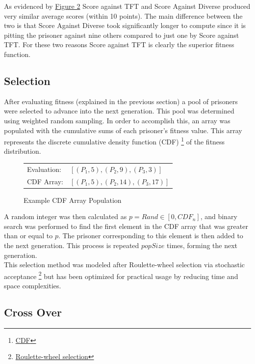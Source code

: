 \documentclass[12pt]{article}
\begin{document}
As evidenced by \hyperref[fig2]{Figure 2} Score against TFT and Score Against Diverse
produced very similar average scores (within 10 points).  The main difference
between the two is that Score Against Diverse took significantly longer to compute
since it is pitting the prisoner against nine others compared to just one by Score against TFT.
For these two reasons Score against TFT is clearly the superior fitness function.

\subsection{Selection}

After evaluating fitness (explained in the previous section) a pool of
prisoners were selected to advance into the next generation.  This pool was
determined using weighted random sampling. In order to accomplish this, an array
was populated with the cumulative sums of each prisoner's fitness value.  This
array represents the discrete cumulative density function (CDF)
\footnote{\href{https://en.wikipedia.org/wiki/Cumulative distribution function}{CDF}}
of the fitness distribution.

\begin{figure}[h]
    \centering
    \begin{tabular}{l l}
        Evaluation: & $[(P_1, 5), (P_2, 9), (P_3, 3)]$ \\
        CDF Array: & $[(P_1, 5), (P_2, 14), (P_3, 17)]$ \\
    \end{tabular}
    \caption{Example CDF Array Population}
\end{figure}

A random integer was then calculated as $p = Rand \in [0, CDF_n]$,
and binary search was performed to find the first element in the CDF array that
was greater than or equal to $p$.  The prisoner corresponding to this element
is then added to the next generation.  This process is repeated $popSize$ times,
forming the next generation. \\

This selection method was modeled after Roulette-wheel selection via stochastic acceptance
\footnote{\href{http://arxiv.org/pdf/1109.3627.pdf}{Roulette-wheel selection}}
but has been optimized for practical usage by reducing time and space complexities.

\subsection{Cross Over}
\end{document}
